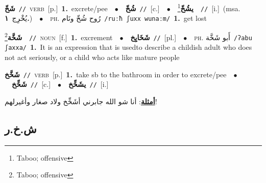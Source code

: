 \documentclass[10pt,a4paper,twoside]{article} %
\begin{document}
\begin{multicols}{2}
{\setlength\topsep{0pt}\textbf{\foreignlanguage{arabic}{شَخّ}}\ {\color{gray}\texttt{//}\color{black}}\ \textsc{verb}\ [p.]\ \textbf{1.}~excrete/pee\ \ $\bullet$\ \ \setlength\topsep{0pt}\textbf{\foreignlanguage{arabic}{شُخّ}}\ {\color{gray}\texttt{//}\color{black}}\ [c.]\ \ $\bullet$\ \ \setlength\topsep{0pt}\textbf{\foreignlanguage{arabic}{يشُخّ}}\footnote{Taboo; offensive}\ \ {\color{gray}\texttt{//}\color{black}}\ [i.]\ \color{gray}(msa. \foreignlanguage{arabic}{يُخْرِج}~\foreignlanguage{arabic}{\textbf{١.}})\color{black}\ \ $\bullet$\ \ \textsc{ph.} \color{gray} \foreignlanguage{arabic}{رُوح شُخّ ونَام}\color{black}\ {\color{gray}\texttt{/{\sffamily ruːħ ʃuxx wunaːm}/}\color{black}}\ \textbf{1.}~get lost\ } \vspace{2mm}

{\setlength\topsep{0pt}\textbf{\foreignlanguage{arabic}{شَخَّة}}\footnote{Taboo; offensive}\ \ {\color{gray}\texttt{//}\color{black}}\ \textsc{noun}\ [f.]\ \textbf{1.}~excrement\ \ $\bullet$\ \ \setlength\topsep{0pt}\textbf{\foreignlanguage{arabic}{شَخَايِخ}}\ {\color{gray}\texttt{//}\color{black}}\ [pl.]\ \ $\bullet$\ \ \textsc{ph.} \color{gray} \foreignlanguage{arabic}{أَبو شَخَّة}\color{black}\ {\color{gray}\texttt{/{\sffamily ʔabu ʃaxxa}/}\color{black}}\ \textbf{1.}~It is an expression that is usedto describe a childish adult who does not act seriously, or a child who acts like mature people\ } \vspace{2mm}

{\setlength\topsep{0pt}\textbf{\foreignlanguage{arabic}{شَخَّخ}}\ {\color{gray}\texttt{//}\color{black}}\ \textsc{verb}\ [p.]\ \textbf{1.}~take sb to the bathroom in order to excrete/pee\ \ $\bullet$\ \ \setlength\topsep{0pt}\textbf{\foreignlanguage{arabic}{شَخِّخ}}\ {\color{gray}\texttt{//}\color{black}}\ [c.]\ \ $\bullet$\ \ \setlength\topsep{0pt}\textbf{\foreignlanguage{arabic}{يشَخِّخ}}\ {\color{gray}\texttt{//}\color{black}}\ [i.]\  \begin{flushright}\color{gray}\foreignlanguage{arabic}{\textbf{\underline{\foreignlanguage{arabic}{أمثلة}}}: أنا شو الله جابرني أشَخِّخ ولاد صغار وأغيرلهم!}\end{flushright}\color{black}} \vspace{2mm}

\vspace{-3mm}
\subsection*{\color{blue}\foreignlanguage{arabic}{ش.خ.ر}\color{blue}{}} 


\end{multicols}
\end{document}
